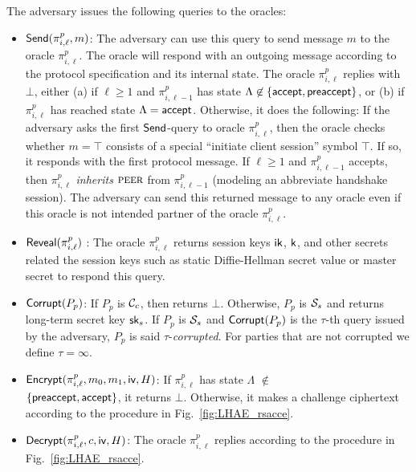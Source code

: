 The adversary issues the following queries to the oracles:
\begin{itemize}
 \item {$\mathsf{Send}(\pi^p_{i, \ell}, m)$:
    The adversary can use this query to send message $m$ to the oracle $\pi^p_{i, \ell}$.
    The oracle will respond with an outgoing message according
    to the protocol specification and its internal state.
    The oracle $\pi^p_{i, \ell}$ replies with $\bot$, either
    (a) if $\ell \geq 1$ and $\pi^p_{i, {\ell-1}}$ has state $\Lambda\not\in \{\mathsf{accept}, \mathsf{preaccept}\}$,
    or
    (b) if $\pi^p_{i,\ell}$ has reached state $\Lambda = \mathsf{accept}$.
    Otherwise, it does the following:
    If the adversary asks the first $\mathsf{Send}$-query to oracle $\pi^p_{i, \ell}$,
    then the oracle checks whether $m = \top$ consists of a special ``initiate client session'' symbol $\top$.
    If so, it responds with the first protocol message.
    If $\ell \geq 1$ and $\pi^p_{i,\ell-1}$ accepts, then $\pi^p_{i,\ell}$ \textit{inherits} $\textsc{peer}$
    from $\pi^p_{i, \ell-1}$ (modeling an abbreviate handshake session).
    The adversary can send this returned message to any oracle even if this oracle is not intended partner of the oracle $\pi^p_{i, \ell}$.}

 \item {$\mathsf{Reveal}(\pi^p_{i,\ell})$ :
    The oracle $\pi^p_{i,\ell}$ returns session keys $\mathsf{ik}$, $\mathsf{k}$, and other secrets related the session keys such as static Diffie-Hellman secret value or master secret to respond this query.}

 \item {$\mathsf{Corrupt}(P_p)$:
    If $P_p$ is $\mathcal{C}_c$, then returns $\bot$. Otherwise, $P_p$ is $\mathcal{S}_s$ and returns
    long-term secret key $\mathsf{sk}_s$.
    If $P_p$ is $\mathcal{S}_s$ and $\mathsf{Corrupt}(P_p)$ is the $\tau$-th query issued by the adversary,
    $P_p$ is said $\tau$-\textit{corrupted}.
    For parties that are not corrupted we define $\tau = \infty$.}

 \item {$\mathsf{Encrypt}(\pi^p_{i,\ell}, m_0, m_1, \mathsf{iv}, H)$:
    If $\pi^p_{i,\ell}$ has state
    $\Lambda$ $\not\in$ \\ $\{\mathsf{preaccept}, \mathsf{accept}\}$, it returns $\bot$.
    Otherwise, it makes a challenge ciphertext according to the procedure in Fig.~\ref{fig:LHAE_rsacce}.}

 \item {$\mathsf{Decrypt}(\pi^p_{i, \ell}, c, \mathsf{iv}, H)$:
    The oracle $\pi^p_{i, \ell}$ replies according to the procedure in Fig.~\ref{fig:LHAE_rsacce}.}
\end{itemize}

